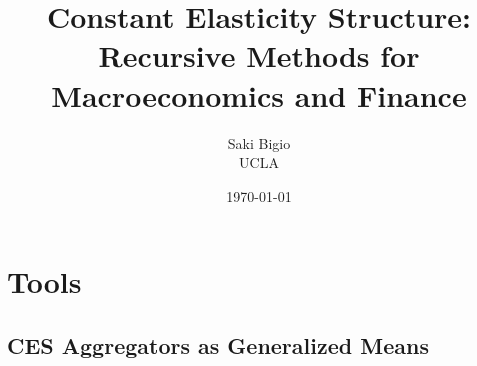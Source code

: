 \documentclass[12pt,openany]{book}
\title{Constant Elasticity Structure: \\ Recursive Methods for Macroeconomics and Finance}
\author{Saki Bigio \\UCLA}
\date{\today}
\begin{document}
\frontmatter
\maketitle

\tableofcontents

\mainmatter

\part{Tools}
\label{part:tools}

\chapter{CES Aggregators as Generalized Means}
\label{ch:ces-aggregators}



\backmatter


\end{document}

